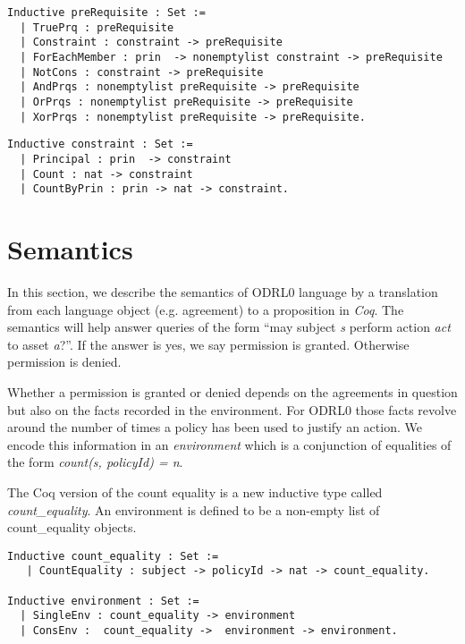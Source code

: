 \lstset{language=Coq}
\begin{lstlisting}[frame=single, caption={preRequisite},label={lst:preRequisitecoq}]
Inductive preRequisite : Set :=
  | TruePrq : preRequisite
  | Constraint : constraint -> preRequisite 
  | ForEachMember : prin  -> nonemptylist constraint -> preRequisite
  | NotCons : constraint -> preRequisite 
  | AndPrqs : nonemptylist preRequisite -> preRequisite
  | OrPrqs : nonemptylist preRequisite -> preRequisite
  | XorPrqs : nonemptylist preRequisite -> preRequisite.
\end{lstlisting}

\lstset{language=Coq}
\begin{lstlisting}[frame=single, caption={constraint},label={lst:constraintcoq}]
Inductive constraint : Set :=
  | Principal : prin  -> constraint 
  | Count : nat -> constraint 
  | CountByPrin : prin -> nat -> constraint.
\end{lstlisting}


\section{Semantics}
\label{sec:Semantics}

In this section, we describe the semantics of ODRL0 language by a translation from each language object (e.g. agreement) to a proposition in \emph{Coq}. The semantics will help answer queries of the form ``may subject \emph{s} perform action \emph{act} to asset \emph{a}?''. If the answer is yes, we say permission is granted. Otherwise permission is denied. 

Whether a permission is granted or denied depends on the agreements in question but also on the facts recorded in the environment. For ODRL0 those facts revolve around the number of times a policy has been used to justify an action. We encode this information in an \emph{environment} which is a conjunction of equalities of the form \emph{count(s, policyId) = n}. 

The Coq version of the count equality is a new inductive type called \emph{count_equality}. An environment is defined to be a non-empty list of count_equality objects.

\begin{lstlisting}
Inductive count_equality : Set := 
   | CountEquality : subject -> policyId -> nat -> count_equality.

Inductive environment : Set := 
  | SingleEnv : count_equality -> environment
  | ConsEnv :  count_equality ->  environment -> environment.

\end{lstlisting}


